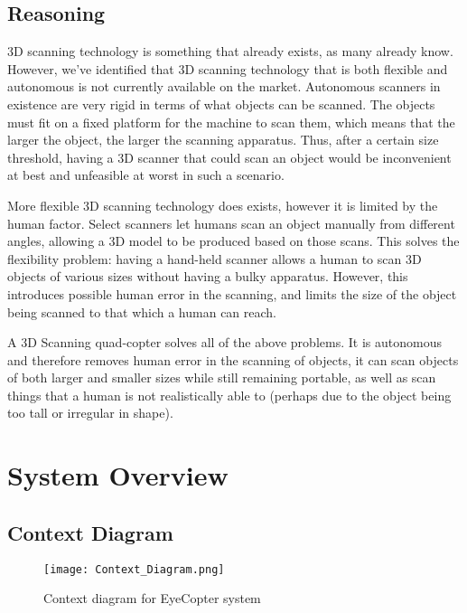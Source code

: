 \documentclass[10pt,letterpaper]{article}
\begin{document}
\subsection{Reasoning}
3D scanning technology is something that already exists, as many already know. However, we've identified that 3D scanning technology that is both flexible and autonomous is not currently available on the market. Autonomous scanners in existence are very rigid in terms of what objects can be scanned. The objects must fit on a fixed platform for the machine to scan them, which means that the larger the object, the larger the scanning apparatus. Thus, after a certain size threshold, having a 3D scanner that could scan an object would be inconvenient at best and unfeasible at worst in such a scenario. \par 
More flexible 3D scanning technology does exists, however it is limited by the human factor. Select scanners let humans scan an object manually from different angles, allowing a 3D model to be produced based on those scans. This solves the flexibility problem: having a hand-held scanner allows a human to scan 3D objects of various sizes without having a bulky apparatus. However, this introduces possible human error in the scanning, and limits the size of the object being scanned to that which a human can reach. \par 
A 3D Scanning quad-copter solves all of the above problems. It is autonomous and therefore removes human error in the scanning of objects, it can scan objects of both larger and smaller sizes while still remaining portable, as well as scan things that a human is not realistically able to (perhaps due to the object being too tall or irregular in shape).


\newpage


\section{System Overview}

\subsection{Context Diagram}
\begin{figure}[h]
\centering
\texttt{[image: Context\_Diagram.png]}
\caption{Context diagram for EyeCopter system}
\label{fig:context_diagram}
\end{figure}
\end{document}
